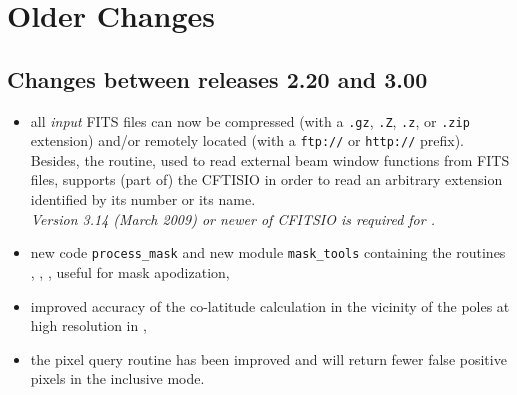 \documentclass[12pt,twoside]{article}
\newcommand{\mysmaller}{%
\latexhtml{\scriptsize}{\normalsize}}
\begin{document}
\section{Older Changes}
{\mysmaller%
\subsection[Changes between releases 2.20 and 3.00]{Changes between releases 2.20
and 3.00}
\label{sub:new3p00}
\begin{itemize}
	\item all {\em input} FITS files can now be compressed (with a 
{\tt .gz}, {\tt .Z}, {\tt .z}, or {\tt .zip} 
extension) and/or remotely located (with a {\tt ftp://} or {\tt http://}
prefix). Besides, the  routine, used to read
external beam window functions from FITS files, supports (part of) the CFTISIO 
 in
order to read an arbitrary extension identified by its number or its name. \\
{\em Version 3.14 (March 2009) or newer of CFITSIO is required for \healpix \hpxversion.}
	\item%
new code {\tt process\_mask} and new module {\tt mask\_tools} containing the routines
, 
, 
,
 useful for mask apodization,
	\item improved accuracy of the co-latitude calculation in the vicinity
of the poles at high resolution in ,
	\item the pixel query routine
has been improved and will return fewer
false positive pixels in the 
inclusive
mode.
\end{itemize}

}
\end{document}
